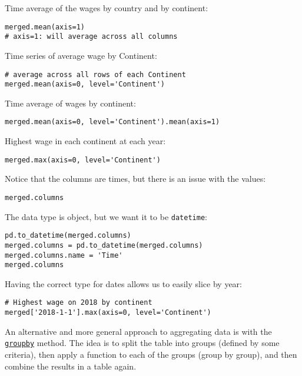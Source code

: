 \documentclass[12pt, a4paper]{article}
\begin{document}
Time average of the wages by country and by continent:
\lstset{language=jupyter-python,label= ,caption= ,captionpos=b,numbers=none}
\begin{lstlisting}
merged.mean(axis=1)
# axis=1: will average across all columns
\end{lstlisting}

Time series of average wage by Continent:
\lstset{language=jupyter-python,label= ,caption= ,captionpos=b,numbers=none}
\begin{lstlisting}
# average across all rows of each Continent
merged.mean(axis=0, level='Continent')
\end{lstlisting}

Time average of wages by continent:
\lstset{language=jupyter-python,label= ,caption= ,captionpos=b,numbers=none}
\begin{lstlisting}
merged.mean(axis=0, level='Continent').mean(axis=1)
\end{lstlisting}

Highest wage in each continent at each year:
\lstset{language=jupyter-python,label= ,caption= ,captionpos=b,numbers=none}
\begin{lstlisting}
merged.max(axis=0, level='Continent')
\end{lstlisting}

Notice that the columns are times, but there is an issue with the values:
\lstset{language=jupyter-python,label= ,caption= ,captionpos=b,numbers=none}
\begin{lstlisting}
merged.columns
\end{lstlisting}

The data type is object, but we want it to be \texttt{datetime}:
\lstset{language=jupyter-python,label= ,caption= ,captionpos=b,numbers=none}
\begin{lstlisting}
pd.to_datetime(merged.columns)
merged.columns = pd.to_datetime(merged.columns)
merged.columns.name = 'Time'
merged.columns
\end{lstlisting}

Having the correct type for dates allows us to easily slice by year:
\lstset{language=jupyter-python,label= ,caption= ,captionpos=b,numbers=none}
\begin{lstlisting}
# Highest wage on 2018 by continent
merged['2018-1-1'].max(axis=0, level='Continent')
\end{lstlisting}

An alternative and more general approach to aggregating data is with the \href{https://pandas.pydata.org/pandas-docs/stable/reference/api/pandas.DataFrame.groupby.html\#pandas.DataFrame.groupby}{\texttt{groupby}} method.
The idea is to split the table into groups (defined by some criteria), then apply a function to each of the groups (group by group), and then combine the results in a table again.
\end{document}
